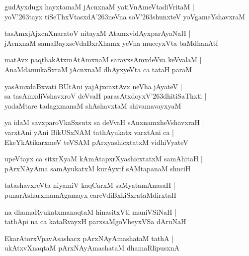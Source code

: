 \documentclass[twoside,12pt,openright]{book}
\def\S{\char'263}
\newcounter{shloka}[chapter]
\begin{document}
\begin{shloka}
gudAyxdugx hayxtamaM jAcnxnaM yatiVnAmeVtadiVritaM |\\
yoV\S tayx tiSeThxVtasxdA\S neVna soV\S shunxteV yoVgameYshavxraM 
\end{shloka}

\begin{shloka}
tasAmxjAjxcnXnaratoV nitayxM AtamxvidAyxparAyaNaH |\\
jAcnxnaM samaBayxseVdaBxrXhamx yeVna muceyxVta baMdhanAtf 
\end{shloka}

\begin{shloka}
matAvx paqthakAtxmAtAmxnaM saravxsAmxdeVva keVvalaM |\\
AnaMdamukaSxraM jAcnxnaM dhAyxyeVta ca tataH paraM 
\end{shloka}

\begin{shloka}
yasAmxdaBxvati BUtAni yajAjxcnxtAvx neVha jAyateV |\\
sa tasAmxdiVshavxroV deVvaH parasAtxdoyxV\S dhitiSaThxti |\\
yadaMtare tadagxmanaM shAshavxtaM shivamavayxyaM 
\end{shloka}

\begin{shloka}
ya idaM savxparoVkaSxsutx sa deVvaH sAnxnamxheVshavxraH |\\
varxtAni yAni BikUSxNAM tathAyukatx varxtAni ca |\\
EkeYkAtikarxmeV teVSAM pArxyashicxtatxM vidhiVyateV 
\end{shloka}

\begin{shloka}
upeVtayx ca sitxrXyaM kAmAtapxrXyashicxtatxM samAhitaH |\\
pArxNAyAma samAyukatxM kurAyxtf sAMtapanaM shuciH 
\end{shloka}

\begin{shloka}
tatashavxreVta niyamiV kaqCarxM saMyatamAnasaH |\\
punarAsharxmamAgamayx careVdiBxkiSxrataMdirxtaH 
\end{shloka}

\begin{shloka}
na dhamaRyukatxmanaqtaM hinasitxVti maniVSiNaH |\\
tathApi na ca kataRvayxH parxsaMgoVheyxVSa dAruNaH 
\end{shloka}

\begin{shloka}
EkarAtorxVpavAsashacx pArxNAyAmashataM tathA |\\
ukAtxvXnaqtaM pArxNAyAmashataM dhamaRlipusxnA 
\end{shloka}
\end{document}
